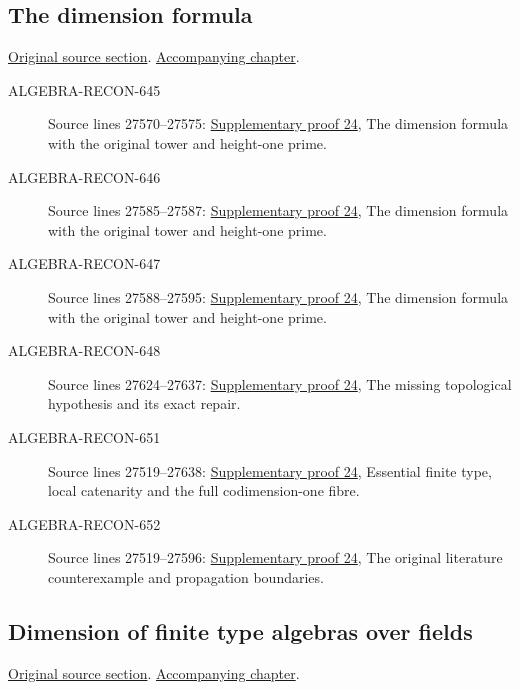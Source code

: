 \subsection{The dimension formula}
\hypertarget{algebra-source-section-dimension-formula}{}
\noindent\href{https://github.com/stacks/stacks-project/blob/a04446e57ec1fbc252a871afcec7752fb2807b14/algebra.tex\#L27512}{Original source section}. \href{algebra.pdf\#nameddest=section-dimension-formula}{Accompanying chapter}.

\begin{description}
\item[ALGEBRA-RECON-645] Source lines 27570--27575: \hyperlink{algebra_dimension_maps_notes_20260928}{Supplementary proof 24}, The dimension formula with the original tower and height-one prime.
\item[ALGEBRA-RECON-646] Source lines 27585--27587: \hyperlink{algebra_dimension_maps_notes_20260928}{Supplementary proof 24}, The dimension formula with the original tower and height-one prime.
\item[ALGEBRA-RECON-647] Source lines 27588--27595: \hyperlink{algebra_dimension_maps_notes_20260928}{Supplementary proof 24}, The dimension formula with the original tower and height-one prime.
\item[ALGEBRA-RECON-648] Source lines 27624--27637: \hyperlink{algebra_dimension_maps_notes_20260928}{Supplementary proof 24}, The missing topological hypothesis and its exact repair.
\item[ALGEBRA-RECON-651] Source lines 27519--27638: \hyperlink{algebra_dimension_maps_notes_20260928}{Supplementary proof 24}, Essential finite type, local catenarity and the full codimension-one fibre.
\item[ALGEBRA-RECON-652] Source lines 27519--27596: \hyperlink{algebra_dimension_maps_notes_20260928}{Supplementary proof 24}, The original literature counterexample and propagation boundaries.
\end{description}

\subsection{Dimension of finite type algebras over fields}
\hypertarget{algebra-source-section-dimension-finite-type-algebras}{}
\noindent\href{https://github.com/stacks/stacks-project/blob/a04446e57ec1fbc252a871afcec7752fb2807b14/algebra.tex\#L27648}{Original source section}. \href{algebra.pdf\#nameddest=section-dimension-finite-type-algebras}{Accompanying chapter}.

